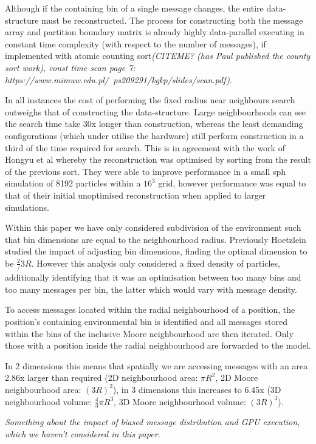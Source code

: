 Although if the containing bin of a single message changes, the entire data-structure must be reconstructed. The process for constructing both the message array and partition boundary matrix is already highly data-parallel executing in constant time complexity (with respect to the number of messages), if implemented with atomic counting sort\textit{(CITEME? (has Paul published the county sort work), const time scan page 7: https://www.mimuw.edu.pl/~ps209291/kgkp/slides/scan.pdf)}.

In all instances the cost of performing the fixed radius near neighbours search outweighs that of constructing the data-structure. Large neighbourhoods can see the search time take 30x longer than construction, whereas the least demanding configurations (which under utilise the hardware) still perform construction in a third of the time required for search. This is in agreement with the work of Hongyu et al whereby the reconstruction was optimised by sorting from the result of the previous sort\cite{HY*15}. They were able to improve performance in a small \gls{sph} simulation of 8192 particles within a $16^{3}$ grid, however performance was equal to that of their initial unoptimised reconstruction when applied to larger simulations.

Within this paper we have only considered subdivision of the environment such that bin dimensions are equal to the neighbourhood radius. Previously Hoetzlein studied the impact of adjusting bin dimensions, finding the optimal dimension to be $\frac{2}/{3}R$\cite{Hoe14}. However this analysis only considered a fixed density of particles, additionally identifying that it was an optimisation between too many bins and too many messages per bin, the latter which would vary with message density.

To access messages located within the radial neighbourhood of a position, the position's containing environmental bin is identified and all messages stored within the bins of the inclusive Moore neighbourhood are then iterated. Only those with a position inside the radial neighbourhood are forwarded to the model.

In 2 dimensions this means that spatially we are accessing messages with an area 2.86x larger than required (2D neighbourhood area: $\pi R^{2}$, 2D Moore neighbourhood area: $(3R)^{2}$), in 3 dimensions this increases to 6.45x (3D neighbourhood volume: $\frac{4}{3}\pi R^{3}$, 3D Moore neighbourhood volume: $(3R)^{3}$).

\textit{Something about the impact of biased message distribution and GPU execution, which we haven't considered in this paper.}

